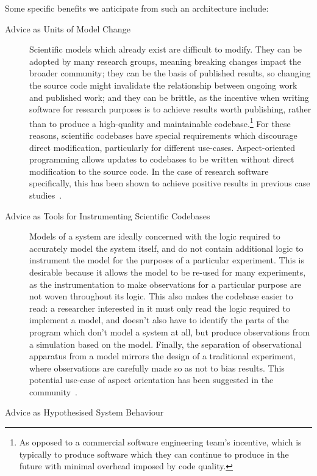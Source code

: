Some specific benefits we anticipate from such an architecture include:

\begin{description}
  \item[Advice as Units of Model Change] Scientific models which already exist
    are difficult to modify. They can be 
    adopted by many research groups, meaning breaking changes impact the broader
    community; they can be the basis of published results, so changing the source
    code might invalidate the relationship between ongoing work and published work;
    and they can be brittle, as the incentive when writing software for research
    purposes is to achieve results worth publishing, rather than to produce a
    high-quality and maintainable codebase.\footnote{As opposed to a commercial
      software engineering team's incentive, which is typically to produce software
      which they can continue to produce in the future with minimal overhead imposed
    by code quality.} For these reasons, scientific codebases have special
    requirements which discourage direct modification, particularly for
    different use-cases. Aspect-oriented programming allows updates to codebases to be
    written without direct modification to the source code. In the case of
    research software specifically, this has been shown to achieve positive
    results in previous case studies~\cite{ionescu2009aspect}.

  \item[Advice as Tools for Instrumenting Scientific Codebases] Models of a
    system are ideally concerned with the logic required to accurately
    model the system itself, and do not contain additional logic to instrument the
    model for the purposes of a particular experiment. This is desirable because it
    allows the model to be re-used for many experiments, as the instrumentation to
    make observations for a particular purpose are not woven throughout its logic.
    This also makes the codebase easier to read: a researcher interested in it
    must only read the logic required to implement a model, and doesn't
    also have to identify the parts of the program which don't model a system at
    all, but produce observations from a simulation based on the model. Finally,
    the separation of observational apparatus from a model mirrors the design of
    a traditional experiment, where observations are carefully made so as not to
    bias results. This potential use-case of aspect orientation has been
    suggested in the community~\cite{gulyas1999use}.

  \item[Advice as Hypothesised System Behaviour] 
\end{description}





